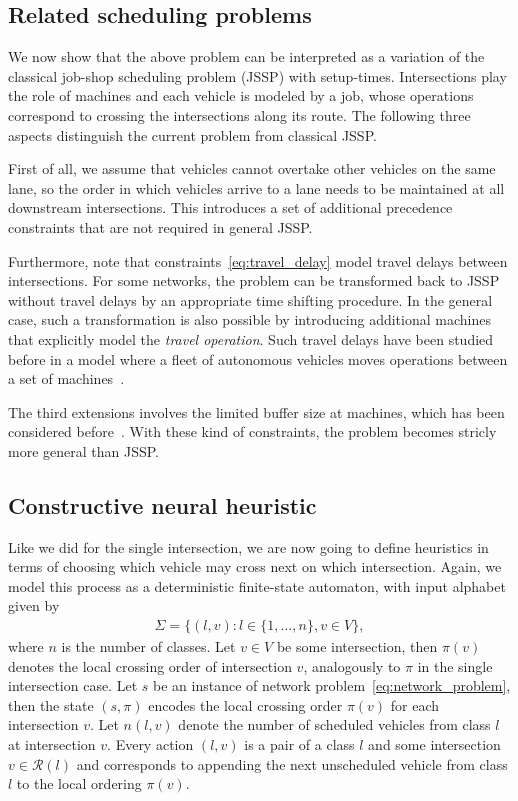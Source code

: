 \documentclass{article}
\theoremstyle{definition}
\theoremstyle{plain}
\begin{document}
\subsection*{Related scheduling problems}

We now show that the above problem can be interpreted as a variation of the
classical job-shop scheduling problem (JSSP) with setup-times. Intersections
play the role of machines and each vehicle is modeled by a job, whose operations
correspond to crossing the intersections along its route. The following three
aspects distinguish the current problem from classical JSSP.

First of all, we assume that vehicles cannot overtake other vehicles on the same
lane, so the order in which vehicles arrive to a lane needs to be maintained at
all downstream intersections. This introduces a set of additional precedence
constraints that are not required in general JSSP.

Furthermore, note that constraints~\eqref{eq:travel_delay} model travel delays between
intersections. For some networks, the problem can be transformed back to JSSP
without travel delays by an appropriate time shifting procedure. In the general
case, such a transformation is also possible by introducing additional machines
that explicitly model the \textit{travel operation}. Such travel delays have been studied
before in a model where a fleet of autonomous vehicles moves operations between
a set of machines~\cite{berterottiereFlexibleJobshopScheduling2024}.

The third extensions involves the limited buffer size at machines, which has
been considered before~\cite{heitmannJobshopSchedulingLimited2007}. With these
kind of constraints, the problem becomes stricly more general than JSSP.


\subsection*{Constructive neural heuristic}

Like we did for the single intersection, we are now going to define heuristics
in terms of choosing which vehicle may cross next on which intersection.
%
Again, we model this process as a deterministic finite-state automaton, with
input alphabet given by
\begin{align*}
  \Sigma = \{ (l,v) : l \in \{1, \dots, n\} , v \in V \} ,
\end{align*}
where $n$ is the number of classes.
%
Let $v \in V$ be some intersection, then $\pi(v)$ denotes the local crossing
order of intersection $v$, analogously to $\pi$ in the single intersection case.
%
Let $s$ be an instance of network problem~\eqref{eq:network_problem}, then the
state $(s, \pi)$ encodes the local crossing order $\pi(v)$ for each intersection
$v$.
%
Let $n(l, v)$ denote the number of scheduled vehicles from class $l$ at
intersection $v$.
%
Every action $(l, v)$ is a pair of a class $l$ and some intersection
$v \in \mathcal{R}(l)$ and corresponds to appending the next unscheduled vehicle
from class $l$ to the local ordering $\pi(v)$.
\end{document}
